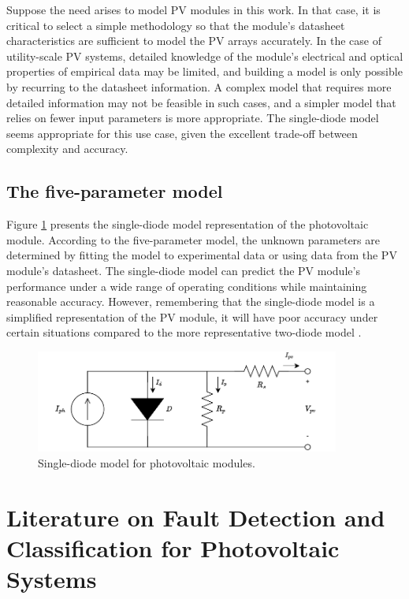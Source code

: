 Suppose the need arises to model PV modules in this work. In that case, it is critical to select a simple methodology so that the module's datasheet characteristics are sufficient to model the PV arrays accurately. In the case of utility-scale PV systems, detailed knowledge of the module's electrical and optical properties of empirical data may be limited, and building a model is only possible by recurring to the datasheet information. A complex model that requires more detailed information may not be feasible in such cases, and a simpler model that relies on fewer input parameters is more appropriate. The single-diode model seems appropriate for this use case, given the excellent trade-off between complexity and accuracy.

\subsection{The five-parameter model}

Figure \ref{fig:onediodedraw} presents the single-diode model representation of the photovoltaic module. According to the five-parameter model, the unknown parameters are determined by fitting the model to experimental data or using data from the PV module's datasheet. The single-diode model can predict the PV module's performance under a wide range of operating conditions while maintaining reasonable accuracy. However, remembering that the single-diode model is a simplified representation of the PV module, it will have poor accuracy under certain situations compared to the more representative two-diode model \cite{Godina2017}.

\begin{figure}[H]
    \centering
    \includegraphics[width=10cm]{figures/chapter2/onediode.drawio.pdf} \caption{Single-diode model for photovoltaic modules.}
    \label{fig:onediodedraw}
\end{figure}

\section{Literature on Fault Detection and Classification for Photovoltaic Systems}

